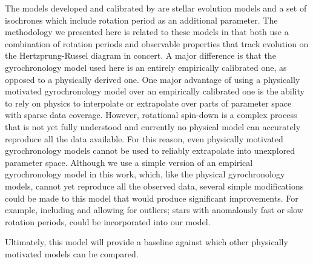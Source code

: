The models developed and calibrated by \citet{epstein2014, vansaders2015,
vansaders2016} are stellar evolution models and a set of isochrones  which
include rotation period as an additional parameter.
The methodology we presented here is related to these models in that both use
a combination of rotation periods and observable properties that track
evolution on the Hertzprung-Russel diagram in concert.
A major difference is that the gyrochronology model used here is an entirely
empirically calibrated one, as opposed to a physically derived one.
One major advantage of using a physically motivated gyrochronology model over
an empirically calibrated one is the ability to rely on physics to interpolate
or extrapolate over parts of parameter space with sparse data coverage.
However, rotational spin-down is a complex process that is not yet fully
understood and currently no physical model can accurately reproduce all the
data available.
For this reason, even physically motivated gyrochronology models cannot be
used to reliably extrapolate into unexplored parameter space.
Although we use a simple version of an empirical gyrochronology model in this
work, which, like the physical gyrochronology models, cannot yet reproduce all
the observed data, several simple modifications could be made to this model
that would produce significant improvements.
For example, including and allowing for outliers; stars with anomalously fast
or slow rotation periods, could be incorporated into our model.

Ultimately, this model will provide a baseline against which other physically
motivated models can be compared.



